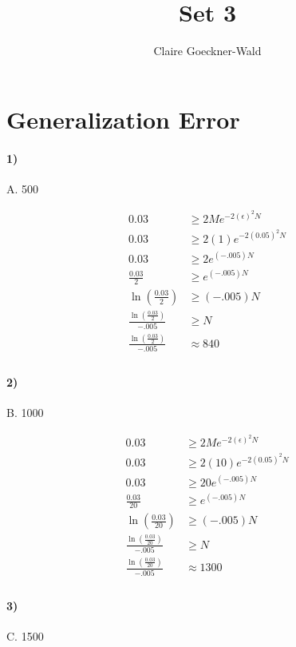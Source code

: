 \documentclass[10pt,letter]{article}
\begin{document}
\title{Set 3}
\author{Claire Goeckner-Wald}
\maketitle 

\section*{Generalization Error}

\paragraph{1)} A. 500

	\begin{align*}
	0.03 &\geq 2 M e ^{-2(\epsilon)^2N} \\
	0.03 &\geq 2 (1) e ^{-2(0.05)^2N} \\
	0.03 &\geq 2 e ^{(-.005)N} \\
	\frac{0.03}{2} &\geq e ^{(-.005)N} \\
	\ln (\frac{0.03}{2}) &\geq (-.005)N \\
	\frac{\ln (\frac{0.03}{2})}{-.005} &\geq N \\
	\frac{\ln (\frac{0.03}{2})}{-.005} &\approx 840 \\
	\end{align*}

\paragraph{2)} B. 1000

	\begin{align*}
	0.03 &\geq 2 M e ^{-2(\epsilon)^2N} \\
	0.03 &\geq 2 (10) e ^{-2(0.05)^2N} \\
	0.03 &\geq 20 e ^{(-.005)N} \\
	\frac{0.03}{20} &\geq e ^{(-.005)N} \\
	\ln (\frac{0.03}{20}) &\geq (-.005)N \\
	\frac{\ln (\frac{0.03}{20})}{-.005} &\geq N \\
	\frac{\ln (\frac{0.03}{20})}{-.005} &\approx 1300 \\
	\end{align*}


\paragraph{3)} C. 1500
\end{document}
